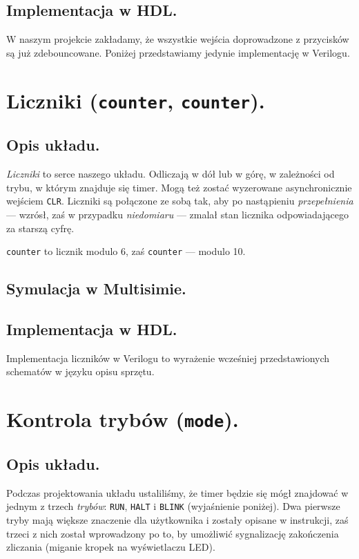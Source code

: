\documentclass[a4paper,oneside]{report}
\newcommand{\debouncer}{\texttt{debouncer}}
\newcommand{\counter}[1]{\texttt{counter\textunderscore #1}}
\newcommand{\mode}{\texttt{mode}}
\begin{document}
\subsection{Implementacja w HDL.}
W naszym projekcie zakładamy, że wszystkie wejścia doprowadzone z
przycisków są już zdebouncowane. Poniżej przedstawiamy jedynie
implementację w Verilogu.


\section{Liczniki (\counter{6}, \counter{10}).}
\subsection{Opis układu.}
\emph{Liczniki} to serce naszego układu. Odliczają w dół lub w
górę, w zależności od trybu, w którym znajduje się timer. Mogą też
zostać wyzerowane asynchronicznie wejściem \texttt{CLR}. Liczniki
są połączone ze sobą tak, aby po nastąpieniu \emph{przepełnienia}
--- wzrósł, zaś w przypadku \emph{niedomiaru} --- zmalał stan
licznika odpowiadającego za starszą cyfrę.

\counter{6} to licznik modulo 6, zaś \counter{10} --- modulo 10.
\subsection{Symulacja w Multisimie.}
\subsection{Implementacja w HDL.}
Implementacja liczników w Verilogu to wyrażenie wcześniej
przedstawionych schematów w języku opisu sprzętu.



\section{Kontrola trybów (\mode).}
\subsection{Opis układu.}
Podczas projektowania układu ustaliliśmy, że timer będzie się mógł
znajdować w jednym z trzech \emph{trybów}: \texttt{RUN},
\texttt{HALT} i \texttt{BLINK} (wyjaśnienie poniżej). Dwa pierwsze
tryby mają większe znaczenie dla użytkownika i zostały opisane w
instrukcji, zaś trzeci z nich został wprowadzony po to, by
umożliwić sygnalizację zakończenia zliczania (miganie kropek
na wyświetlaczu LED).
\end{document}
